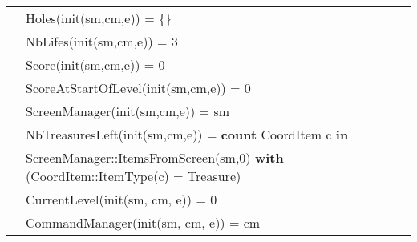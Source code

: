 \documentclass[7pt]{article}
\begin{document}
\begin{tabular}{rl}
       & Holes(init(sm,cm,e)) = \{\} \\
       & NbLifes(init(sm,cm,e)) = 3 \\
       & Score(init(sm,cm,e)) = 0 \\
       & ScoreAtStartOfLevel(init(sm,cm,e)) = 0 \\
       & ScreenManager(init(sm,cm,e)) = sm \\
       & NbTreasuresLeft(init(sm,cm,e)) = \textbf{count} CoordItem c \textbf{in} \\
       & \quad ScreenManager::ItemsFromScreen(sm,0) \textbf{with} (CoordItem::ItemType(c) = Treasure) \\
       & CurrentLevel(init(sm, cm, e)) = 0 \\
       & CommandManager(init(sm, cm, e)) = cm \\
       

       
\end{tabular}
\newpage
\end{document}
